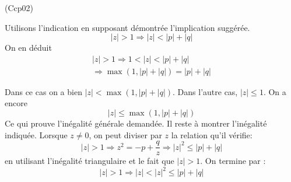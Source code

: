 \begin{tiny}(Ccp02)\end{tiny} Utilisons l'indication en supposant démontrée l'implication suggérée.
\begin{displaymath}
 |z|>1 \Rightarrow |z|<|p|+|q|   
\end{displaymath}
On en déduit
\begin{multline*}
|z|>1 \Rightarrow 1<|z|<|p|+|q|\\
 \Rightarrow \max(1,|p|+|q|)=|p|+|q|
\end{multline*}

Dans ce cas on a bien $|z|< \max(1,|p|+|q|)$.\newline
Dans l'autre cas, $|z|\leq 1$. On a encore 
\begin{displaymath}
 |z|\leq \max(1,|p|+|q|)
\end{displaymath}
Ce qui prouve l'inégalité générale demandée.\newline
Il reste à montrer l'inégalité indiquée. Lorsque $z\neq 0$, on peut diviser par $z$ la relation qu'il vérifie:
\begin{displaymath}
 |z|>1 \Rightarrow z^2 = -p+\frac{q}{z}
\Rightarrow |z|^2 \leq |p|+|q|
\end{displaymath}
en utilisant l'inégalité triangulaire et le fait que $|z|>1$.
On termine par :
\begin{displaymath}
 |z|>1\Rightarrow |z|<|z|^2\leq |p|+|q|
\end{displaymath}

